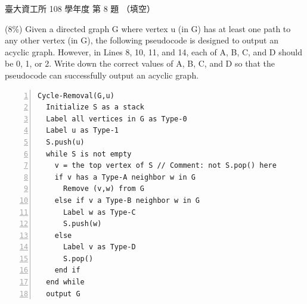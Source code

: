 \begin{pastexam}[label={px:ntu-108-dsaa-08}]{臺大資工所 108 學年度 第 8 題}
（填空）

(8\%) Given a directed graph G where vertex u (in G) has at least one path to any other vertex
(in G), the following pseudocode is designed to output an acyclic graph. However, in Lines 8, 10,
11, and 14, each of A, B, C, and D should be 0, 1, or 2. Write down the correct values of A, B, C,
and D so that the pseudocode can successfully output an acyclic graph.
\begin{lstlisting}[numbers=left, numberstyle=\footnotesize, basicstyle=\ttfamily\small,
    keywordstyle=\bfseries, morekeywords={while,if,else,end}, frame=single,
    columns=fullflexible, keepspaces=true, xleftmargin=2.5em, framexleftmargin=2em]
Cycle-Removal(G,u)
  Initialize S as a stack
  Label all vertices in G as Type-0
  Label u as Type-1
  S.push(u)
  while S is not empty
    v = the top vertex of S // Comment: not S.pop() here
    if v has a Type-A neighbor w in G
      Remove (v,w) from G
    else if v a Type-B neighbor w in G
      Label w as Type-C
      S.push(w)
    else
      Label v as Type-D
      S.pop()
    end if
  end while
  output G
\end{lstlisting}
\end{pastexam}

